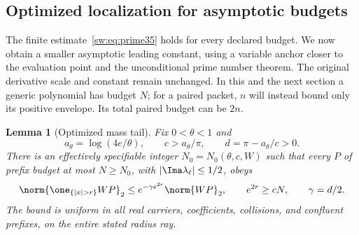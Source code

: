 \documentclass[11pt,a4paper]{article}
\numberwithin{equation}{section}
\newtheorem{lemma}[theorem]{Lemma}
\theoremstyle{definition}\newtheorem{definition}[theorem]{Definition}
\theoremstyle{remark}\newtheorem{remark}[theorem]{Remark}
\begin{document}
\subsection{Optimized localization for asymptotic budgets}\label{sw:sec:pnt-local}
The finite estimate~\eqref{sw:eq:prime35} holds for every declared budget. We now obtain a smaller asymptotic leading constant, using a variable anchor closer to the evaluation point and the unconditional prime number theorem. The original derivative scale and constant remain unchanged. In this and the next section a generic polynomial has budget $N$; for a paired packet, $n$ will instead bound only its positive envelope. Its total paired budget can be $2n$.

\begin{lemma}[Optimized mass tail]\label{sw:lem:optimized-tail}
Fix $0<\theta<1$ and
\begin{equation}\label{sw:eq:optimized-parameters}
 a_\theta=\log(4e/\theta),\qquad c>a_\theta/\pi,
 \qquad d=\pi-a_\theta/c>0.
\end{equation}
There is an effectively specifiable integer $N_0=N_0(\theta,c,W)$ such that every $P$ of prefix budget at most $N\ge N_0$, with $|\Ima\lambda_\ell|\le1/2$, obeys
\begin{equation}\label{sw:eq:optimized-tail}
 \norm{\one_{\{|x|>r\}}WP}_2
 \le e^{-\gamma e^{2r}}\norm{WP}_2,
 \qquad e^{2r}\ge cN,\qquad \gamma=d/2.
\end{equation}
The bound is uniform in all real carriers, coefficients, collisions, and confluent prefixes, on the entire stated radius ray.
\end{lemma}
\end{document}
